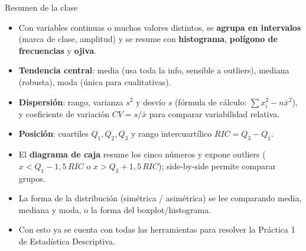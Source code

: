 \documentclass[aspectratio=169,11pt]{beamer}
\begin{document}
\begin{frame}{Resumen de la clase}
\begin{itemize}
\item Con variables continuas o muchos valores distintos, se \textbf{agrupa en intervalos} (marca de clase, amplitud) y se resume con \textbf{histograma}, \textbf{polígono de frecuencias} y \textbf{ojiva}.
\item \textbf{Tendencia central}: media (usa toda la info, sensible a outliers), mediana (robusta), moda (única para cualitativas).
\item \textbf{Dispersión}: rango, varianza $s^2$ y desvío $s$ (fórmula de cálculo: $\sum x_i^2 - n\bar{x}^2$), y coeficiente de variación $CV=s/\bar{x}$ para comparar variabilidad relativa.
\item \textbf{Posición}: cuartiles $Q_1,Q_2,Q_3$ y rango intercuartílico $RIC=Q_3-Q_1$.
\item El \textbf{diagrama de caja} resume los cinco números y expone outliers ($x<Q_1-1{,}5\,RIC$ o $x>Q_3+1{,}5\,RIC$); side-by-side permite comparar grupos.
\item La forma de la distribución (simétrica / asimétrica) se lee comparando media, mediana y moda, o la forma del boxplot/histograma.
\item Con esto ya se cuenta con todas las herramientas para resolver la Práctica 1 de Estadística Descriptiva.
\end{itemize}
\end{frame}
\end{document}
